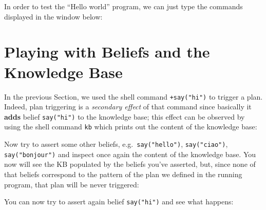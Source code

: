 In order to test the ``Hello world'' program, we can just type the commands
displayed in the window below:


\section{Playing with Beliefs and the Knowledge Base}
In the previous Section, we used the shell command \texttt{+say("hi")} to
trigger a plan.
Indeed, plan triggering is a \emph{secondary effect} of that command since
basically it \textbf{adds} belief \texttt{say("hi")} to the knowledge base;
this effect can be observed by using the shell command \texttt{kb} which
prints out the content of the knowledge base:

Now try to assert some other beliefs, e.g.~\texttt{say("hello")},
\texttt{say("ciao")}, \texttt{say("bonjour")} and inspect once again the
content of the knowledge base. You now will see the KB populated by the
beliefs you've asserted, but, since none of that beliefs correspond to the
pattern of the plan we defined in the running program, that plan will be
never triggered:

You can now try to assert again belief \texttt{say("hi")} and see what
happens:

